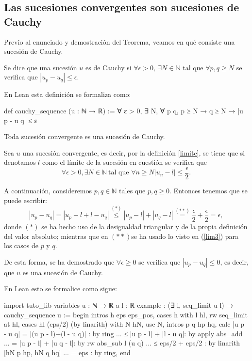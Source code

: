 \subsection{Las sucesiones convergentes son sucesiones de Cauchy}
Previo al enunciado y demostración del Teorema, veamos en qué consiste una sucesión de Cauchy.
\begin{definicion}
	Se dice que una sucesión \(u\) es de Cauchy si \(\forall \epsilon >0, \ \exists N\in \mathbb{N} \) tal que \( \forall p, q \geq N\) se verifica que \(|u_p-u_q| \leq \epsilon \).
\end{definicion}
En Lean esta definición se formaliza como:
\begin{leancode}
def cauchy_sequence (u : ℕ → ℝ) := 
∀ ε > 0, ∃ N, ∀ p q, p ≥ N → q ≥ N → |u p - u q| ≤ ε
\end{leancode}
\begin{teorema}
	Toda sucesión convergente es una sucesión de Cauchy.
\end{teorema}
\begin{demostracion}
	Sea \(u\) una sucesión convergente, es decir, por la definición \ref{limite}, se tiene que si denotamos \(l\) como el límite de la sucesión en cuestión se verifica que
\begin{equation}\label{lim3}
\forall \epsilon >0, \exists N \in \mathbb{N} \ \text{tal que }\forall n \geq N |u_n-l| \leq \frac{\epsilon}{2}.
\end{equation}

A continuación, consideremos \(p,q \in \mathbb{N}\) tales que \(p,q \geq 0\). Entonces tenemos que se puede escribir:
\begin{equation*}
|u_p-u_q| = |u_p-l+l-u_q| \stackrel{(*)}{\leq} |u_p-l|+|u_q-l|\stackrel{(**)}{=} \frac{\epsilon}{2}+\frac{\epsilon}{2}=\epsilon,
\end{equation*}
donde \( (*) \) se ha hecho uso de la desigualdad triangular y de la propia definición del valor absoluto; mientras que en \((**) \)se ha usado lo visto en (\ref{lim3}) para los casos de \(p\) y \(q\).

De esta forma, se ha demostrado que \(\forall \epsilon \geq 0\) se verifica que \( |u_p-u_q| \leq 0\), es decir, que \(u\) es una sucesión de Cauchy.
\end{demostracion}

En Lean esto se formalice como sigue:
\begin{leancode}
import tuto_lib
variables {u : ℕ → ℝ} {a l : ℝ}
example : (∃ l, seq_limit u l) → cauchy_sequence u :=
begin
intros h eps eps_pos,
cases h with l hl,
rw seq_limit at hl,
cases hl (eps/2) (by linarith) with N hN,
use N,
intros p q hp hq,
calc |u p - u q| = |(u p - l)+(l - u q)| : by ring
... ≤ |u p - l| + |l - u q|: by apply abs_add
... = |u p - l| + |u q - l|: by rw abs_sub l (u q)
... ≤ eps/2 + eps/2 : by linarith [hN p hp, hN q hq]
... = eps : by ring,
end
\end{leancode}

